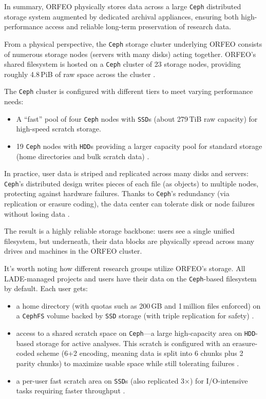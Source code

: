 In summary, ORFEO physically stores data across a large \texttt{Ceph} 
distributed storage system augmented by dedicated archival appliances, ensuring 
both high-performance access and reliable long-term preservation of research 
data.

\medskip

From a physical perspective, the \texttt{Ceph} storage cluster underlying ORFEO 
consists of numerous storage nodes (servers with many disks) acting together. 
ORFEO’s shared filesystem is hosted on a \texttt{Ceph} cluster of 23 storage 
nodes, providing roughly 4.8\,PiB of raw space across the 
cluster \parencite{ORFEO_Docs_Storage,orfeo-changelog-2024}. 

The \texttt{Ceph} cluster is configured with different tiers to meet varying 
performance needs:
\begin{itemize}
	\item A “fast” pool of four \texttt{Ceph} nodes with \texttt{SSD}s (about 
	279\,TiB raw capacity) for high-speed scratch storage.
	\item 19 \texttt{Ceph} nodes with \texttt{HDD}s providing a larger capacity 
	pool for standard storage (home directories and bulk scratch 
	data) \parencite{ORFEO_Docs_Storage}.
\end{itemize}

In practice, user data is striped and replicated across many disks and servers: 
\texttt{Ceph}’s distributed design writes pieces of each file (as objects) to 
multiple nodes, protecting against hardware failures. Thanks to \texttt{Ceph}’s 
redundancy (via replication or erasure coding), the data center can tolerate 
disk or node failures without losing data \parencite{Ceph_RADOS,Ceph_Pools,Ceph_EC}. 

The result is a highly reliable storage backbone: users see a single unified 
filesystem, but underneath, their data blocks are physically spread across many 
drives and machines in the ORFEO cluster.

\medskip

It’s worth noting how different research groups utilize ORFEO’s storage. All 
LADE-managed projects and users have their data on the \texttt{Ceph}-based 
filesystem by default. Each user gets:
\begin{itemize}
	\item a home directory (with quotas such as 200\,GB and 1\,million files 
	enforced) on a \texttt{CephFS} volume backed by \texttt{SSD} storage 
	(with triple replication for safety) \parencite{ORFEO_Docs_Storage}.
	\item access to a shared scratch space on \texttt{Ceph}—a large 
	high-capacity area on \texttt{HDD}-based storage for active analyses. This 
	scratch is configured with an erasure-coded scheme (6+2 encoding, meaning 
	data is split into 6 chunks plus 2 parity chunks) to maximize usable space 
	while still tolerating failures \parencite{Ceph_EC,Ceph_RADOS}.
	\item a per-user fast scratch area on \texttt{SSD}s (also replicated 3$\times$) 
	for I/O-intensive tasks requiring faster throughput \parencite{Ceph_Pools}.
\end{itemize}

